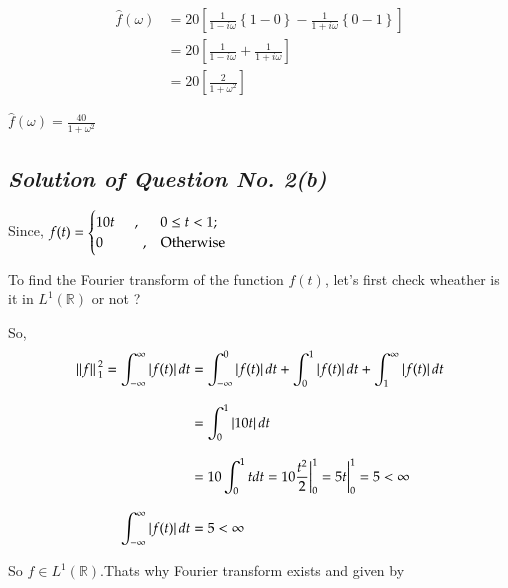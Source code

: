 \documentclass[12pt, a4paper]{article} %
\begin{document}
\begin{equation*}
    \begin{split}
        \hat{f}(\omega) & = 20\left[\frac{1}{1-i\omega}\left\{1-0\right\} - \frac{1}{1+i\omega}\left\{0-1\right\}\right]\\[3mm]
        & = 20\left[\frac{1}{1-i\omega} + \frac{1}{1+i\omega}\right]\\[3mm]
        & = 20\left[\frac{2}{1+\omega^2}\right]
    \end{split}
\end{equation*}
\BgThispage
\begin{center}
    $\displaystyle \boxed{\hat{f}(\omega)  = \frac{40}{1 + \omega^2}} $
\end{center}

\subsection{\slshape Solution of Question No. 2(b)}

Since, $\displaystyle f(t) = \begin{cases}
    10t \hspace*{0.5cm},\hspace*{0.5cm} 0\leq t < 1 ; &
    \\
    0\hspace*{1cm},\hspace*{0.3cm} \mbox{Otherwise}
\end{cases}$    


To find the Fourier transform of the function $f(t)$, let's first check wheather is it in $L^1(\mathbb{R})$ or not ?

So, \begin{equation*}
    \begin{split}
        \norm*{f}_1^2 = \int_{-\infty}^{\infty} \abs*{f(t)}dt & = \int_{-\infty}^{0}\abs*{f(t)}dt +  \int_{0}^{1}\abs*{f(t)}dt + \int_{1}^{\infty}\abs*{f(t)}dt\\[3mm]
        & = \int_{0}^{1} \abs*{10t}dt\\[3mm]
        & = 10\int_{0}^{1} tdt = 10 \frac{t^2}{2}\bigg|_0^1 = 5t\bigg|_0^1 = 5 < \infty\\[3mm] 
        \int_{-\infty}^{\infty} \abs*{f(t)}dt & = 5 < \infty 
    \end{split}
\end{equation*}

So $f\in L^1(\mathbb{R})$.Thats why Fourier transform exists and given by
\end{document}
